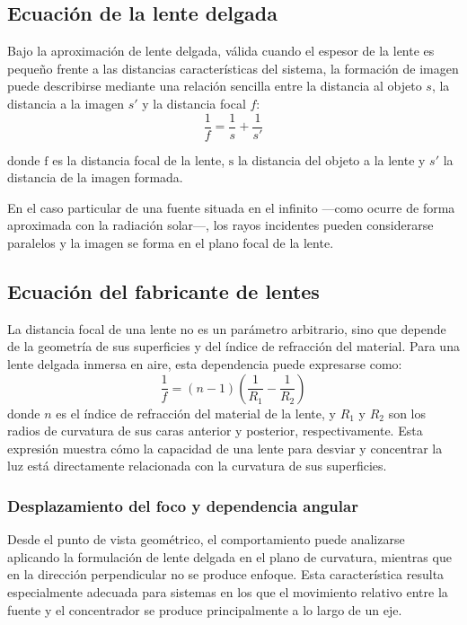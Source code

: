 \subsection{Ecuación de la lente delgada}
Bajo la aproximación de lente delgada, válida cuando el espesor de la lente es pequeño frente a las distancias características del sistema, la formación de imagen puede describirse mediante una relación sencilla entre la distancia al objeto $s$, la distancia a la imagen $s'$ y la distancia focal $f$:
\begin{equation}
	\frac{1}{f} = \frac{1}{s} + \frac{1}{s'}
\end{equation}

donde $\mathrm{f}$ es la distancia focal de la lente, $\mathrm{s}$ la distancia del objeto a la lente y $s'$
la distancia de la imagen formada. 

En el caso particular de una fuente situada en el infinito —como ocurre de forma aproximada con la radiación solar—, los rayos incidentes pueden considerarse paralelos y la imagen se forma en el plano focal de la lente.


\subsection{Ecuación del fabricante de lentes}
La distancia focal de una lente no es un parámetro arbitrario, sino que depende de la geometría de sus superficies y del índice de refracción del material. Para una lente delgada inmersa en aire, esta dependencia puede expresarse como:
\begin{equation}
	\frac{1}{f} = (n - 1)\left( \frac{1}{R_1} - \frac{1}{R_2} \right)
\end{equation}
donde $n$ es el índice de refracción del material de la lente, y $R_1$ y $R_2$ son los radios de curvatura de sus caras anterior y posterior, respectivamente. Esta expresión muestra cómo la capacidad de una lente para desviar y concentrar la luz está directamente relacionada con la curvatura de sus superficies.


\subsubsection{Desplazamiento del foco y dependencia angular}

Desde el punto de vista geométrico, el comportamiento puede analizarse aplicando la formulación de lente delgada en el plano de curvatura, mientras que en la dirección perpendicular no se produce enfoque. Esta característica resulta especialmente adecuada para sistemas en los que el movimiento relativo entre la fuente y el concentrador se produce principalmente a lo largo de un eje.


